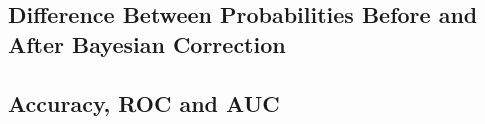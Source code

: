 \documentclass[a4paper]{article}
\begin{document}
\subsection{Difference Between Probabilities Before and After Bayesian Correction}\label{bayes_correction}


\subsection{Accuracy, ROC and AUC}\label{app_metrics}

\end{document}
